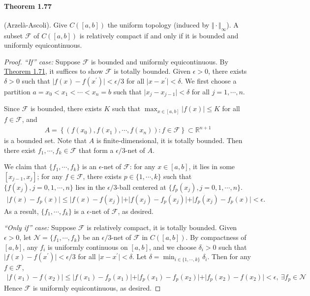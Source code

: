 \documentclass{article}
\begin{document}
\paragraph{Theorem 1.77\label{thm:1.77}} (Arzelà-Ascoli). Give $C([a,b])$ the uniform topology (induced by $\Vert\cdot\Vert_\infty$). A subset $\mathcal{F}$ of $C([a,b])$ is relatively compact if and only if it is bounded and uniformly equicontinuous.
\begin{proof}
\textit{``If'' case:} Suppose $\mathcal{F}$ is bounded and uniformly equicontinuous. By \hyperref[thm:1.71]{Theorem 1.71}, it suffices to show $\mathcal{F}$ is totally bounded. Given $\epsilon>0$, there exists $\delta>0$ such that $\vert f(x)-f(x^\prime)\vert < \epsilon/3$ for all $\vert x-x^\prime\vert < \delta$. We first choose a partition $a=x_0<x_1<\cdots < x_n = b$ such that $\vert x_j - x_{j-1}\vert < \delta$ for all $j=1,\cdots,n$.

Since $\mathcal{F}$ is bounded, there exists $K$ such that $\max_{x\in[a,b]}\vert f(x)\vert \leq K$ for all $f\in\mathcal{F}$, and
\begin{align*}
	A=\left\{\left(f(x_0),f(x_1),\cdots,f(x_n)\right):f\in\mathcal{F}\right\}\subset\mathbb{R}^{n+1}
\end{align*}
is a bounded set. Note that $A$ is finite-dimensional, it is totally bounded. Then there exist $f_1,\cdots,f_k\in\mathcal{F}$ that form a $\epsilon/3$-net of $A$.

We claim that $\{f_1,\cdots,f_k\}$ is an $\epsilon$-net of $\mathcal{F}$: for any $x\in[a,b]$, it lies in some $[x_{j-1},x_j]$; for any $f\in\mathcal{F}$, there exists $p\in\{1,\cdots,k\}$ such that $\{f(x_j),j=0,1,\cdots,n\}$ lies in the $\epsilon/3$-ball centered at $\{f_p(x_j),j=0,1,\cdots,n\}$.
\begin{align*}
	\vert f(x) - f_p(x)\vert \leq \vert f(x) - f(x_j)\vert + \vert f(x_j) - f_p(x_j)\vert + \vert f_p(x_j) - f_p(x)\vert  < \epsilon.
\end{align*}
As a result, $\{f_1,\cdots,f_k\}$ is a $\epsilon$-net of $\mathcal{F}$, as desired.
\vspace{0.1cm}

\textit{``Only if'' case:} Suppose $\mathcal{F}$ is relatively compact, it is totally bounded. Given $\epsilon>0$, let $\mathcal{N}=\{f_1,\cdots,f_k\}$ be an $\epsilon/3$-net of $\mathcal{F}$ in $C([a,b])$. By compactness of $[a,b]$, any $f_i$ is uniformly continuous on $[a,b]$, and we choose $\delta_i>0$ such that $\vert f(x)-f(x^\prime)\vert < \epsilon/3$ for all $\vert x-x^\prime\vert < \delta$. Let $\delta=\min_{i\in\{1,\cdots,k\}}\delta_i$. Then for any $f\in\mathcal{F}$,
\begin{align*}
	\vert f(x_1) - f(x_2)\vert \leq \vert f(x_1) - f_p(x_1)\vert + \vert f_p(x_1) - f_p(x_2)\vert + \vert f_p(x_2) - f(x_2)\vert < \epsilon,\ \exists f_p\in\mathcal{N}
\end{align*}
Hence $\mathcal{F}$ is uniformly equicontinuous, as desired.
\end{proof}
\end{document}
